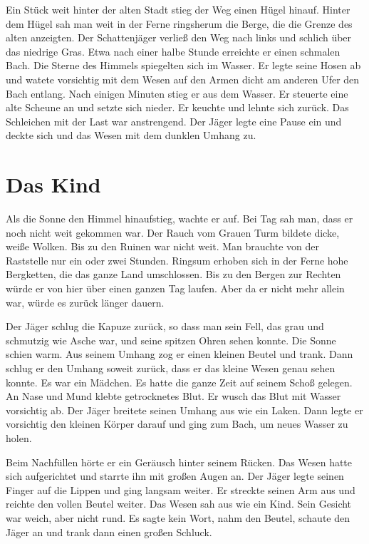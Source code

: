 \documentclass[12pt,a4paper,onecolumn,twoside,ngerman]{book}
\begin{document}
Ein Stück weit hinter der alten Stadt stieg der Weg einen Hügel hinauf. Hinter dem Hügel sah man weit in der Ferne ringsherum die Berge, die die Grenze des alten  anzeigten. Der Schattenjäger verließ den Weg nach links und schlich über das niedrige Gras. Etwa nach einer halbe Stunde erreichte er einen schmalen Bach. Die Sterne des Himmels spiegelten sich im Wasser. Er legte seine Hosen ab und watete vorsichtig mit dem Wesen auf den Armen dicht am anderen Ufer den Bach entlang. Nach einigen Minuten stieg er aus dem Wasser. Er steuerte eine alte Scheune an und setzte sich nieder. Er keuchte und lehnte sich zurück. Das Schleichen mit der Last war anstrengend. Der Jäger legte eine Pause ein und deckte sich und das Wesen mit dem dunklen Umhang zu.

\section{Das Kind}
Als die Sonne den Himmel hinaufstieg, wachte er auf. Bei Tag sah man, dass er noch nicht weit gekommen war. Der Rauch vom Grauen Turm bildete dicke, weiße Wolken. Bis zu den Ruinen war nicht weit. Man brauchte von der Raststelle nur ein oder zwei Stunden. Ringsum erhoben sich in der Ferne hohe Bergketten, die das ganze Land umschlossen. Bis zu den Bergen zur Rechten würde er von hier über einen ganzen Tag laufen. Aber da er nicht mehr allein war, würde es zurück länger dauern.

Der Jäger schlug die Kapuze zurück, so dass man sein Fell, das grau und schmutzig wie Asche war, und seine spitzen Ohren sehen konnte. Die Sonne schien warm. Aus seinem Umhang zog er einen kleinen Beutel und trank. Dann schlug er den Umhang soweit zurück, dass er das kleine Wesen genau sehen konnte. Es war ein Mädchen. Es hatte die ganze Zeit auf seinem Schoß gelegen. An Nase und Mund klebte getrocknetes Blut. Er wusch das Blut mit Wasser vorsichtig ab. Der Jäger breitete seinen Umhang aus wie ein Laken. Dann legte er vorsichtig den kleinen Körper darauf und ging zum Bach, um neues Wasser zu holen.

Beim Nachfüllen hörte er ein Geräusch hinter seinem Rücken. Das Wesen hatte sich aufgerichtet und starrte ihn mit großen Augen an. Der Jäger legte seinen Finger auf die Lippen und ging langsam weiter. Er streckte seinen Arm aus und reichte den vollen Beutel weiter. Das Wesen sah aus wie ein Kind. Sein Gesicht war weich, aber nicht rund. Es sagte kein Wort, nahm den Beutel, schaute den Jäger an und trank dann einen großen Schluck. 
\end{document}
